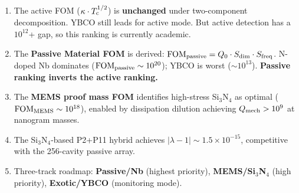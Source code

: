\documentclass[11pt]{article}
\theoremstyle{definition}
\theoremstyle{remark}
\newcommand{\ee}[1]{\times 10^{#1}}
\newcommand{\Tc}{T_{\rm c}}
\newcommand{\FOMpassive}{\mathrm{FOM}_{\rm passive}}
\newcommand{\FOMMEMS}{\mathrm{FOM}_{\rm MEMS}}
\newcommand{\lam}{|\lambda-1|}
\begin{document}
\begin{tcolorbox}[colback=green!5!white, colframe=green!50!black,
  title=\textbf{W3i6 Materials Science: Key Conclusions}]
\begin{enumerate}[nosep]
  \item The active FOM ($\kappa\cdot\Tc^{1/2}$) is \textbf{unchanged}
    under two-component decomposition. YBCO still leads for active mode.
    But active detection has a $10^{12}$+ gap, so this ranking is
    currently academic.
  \item The \textbf{Passive Material FOM} is derived:
    $\FOMpassive = Q_0 \cdot S_{\rm dim} \cdot S_{\rm freq}$.
    N-doped Nb dominates ($\FOMpassive \sim 10^{20}$); YBCO is worst
    ($\sim 10^{13}$). \textbf{Passive ranking inverts the active ranking.}
  \item The \textbf{MEMS proof mass FOM} identifies high-stress Si$_3$N$_4$
    as optimal ($\FOMMEMS \sim 10^{18}$), enabled by dissipation dilution
    achieving $Q_{\rm mech} > 10^9$ at nanogram masses.
  \item The Si$_3$N$_4$-based P2+P11 hybrid achieves $\lam \sim 1.5\ee{-15}$,
    competitive with the 256-cavity passive array.
  \item Three-track roadmap: \textbf{Passive/Nb} (highest priority),
    \textbf{MEMS/Si$_3$N$_4$} (high priority), \textbf{Exotic/YBCO}
    (monitoring mode).
\end{enumerate}
\end{tcolorbox}
\end{document}
